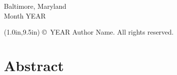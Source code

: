 \documentclass[12pt,letterpaper]{article}   %
\def\GlobalMargin{1.0in}
\def\MainTextSpacing{\singlespacing}        %
\def\TOCTextSpacing{\singlespacing}         %
\numberwithin{equation}{section}        %
\theoremstyle{definition}
\begin{document}

\vspace{0.75in}                     %



\begin{center}
    Baltimore, Maryland \\          %
    Month YEAR                      %
    
    {\begin{textblock*}{\textwidth}(\GlobalMargin,9.5in)
        \copyright\ YEAR Author Name. All rights reserved.
    \end{textblock*}
    \null}
\end{center}







\clearpage 
{}
\setcounter{page}{2}
\MainTextSpacing
{}
\section*{Abstract}

\blindtext




\clearpage
{}
\TOCTextSpacing                         %
\hypersetup{linkcolor=black}            %


\renewcommand{\contentsname}{Table of Contents \vspace{3.6pt} \hrule}
\tableofcontents


\clearpage {}
\renewcommand{\listtablename}{List of Tables \vspace{3.6pt} \hrule}
\listoftables
\clearpage
\end{document}
